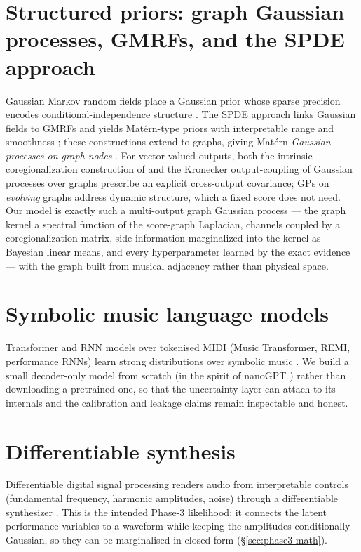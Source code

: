 \documentclass[11pt,a4paper]{report}
\begin{document}
\section{Structured priors: graph Gaussian processes, GMRFs, and the SPDE approach}
Gaussian Markov random fields place a Gaussian prior whose sparse precision encodes
conditional-independence structure \cite{rueheld2005}. The SPDE approach links
Gaussian fields to GMRFs and yields Mat\'ern-type priors with interpretable range
and smoothness \cite{lindgren2011}; these constructions extend to graphs, giving
Mat\'ern \emph{Gaussian processes on graph nodes} \cite{borovitskiy2021}. For
vector-valued outputs, both the intrinsic-coregionalization construction of
\cite{borovitskiy2021} and the Kronecker output-coupling of Gaussian processes over
graphs \cite{venkitaraman2018} prescribe an explicit cross-output covariance;
GPs on \emph{evolving} graphs \cite{blancomulero2021} address dynamic structure,
which a fixed score does not need. Our model is exactly such a multi-output graph
Gaussian process --- the graph kernel a spectral function of the score-graph
Laplacian, channels coupled by a coregionalization matrix, side information
marginalized into the kernel as Bayesian linear means, and every hyperparameter
learned by the exact evidence --- with the graph built from musical adjacency
rather than physical space.

\section{Symbolic music language models}
Transformer and RNN models over tokenised MIDI (Music Transformer, REMI,
performance RNNs) learn strong distributions over symbolic music
\cite{musictransformer,remi,oore2018}. We build a small decoder-only model from
scratch (in the spirit of nanoGPT \cite{nanogpt}) rather than downloading a
pretrained one, so that the uncertainty layer can attach to its internals and the
calibration and leakage claims remain inspectable and honest.

\section{Differentiable synthesis}
Differentiable digital signal processing renders audio from interpretable controls
(fundamental frequency, harmonic amplitudes, noise) through a differentiable
synthesizer \cite{ddsp}. This is the intended Phase-3 likelihood: it connects the
latent performance variables to a waveform while keeping the amplitudes
conditionally Gaussian, so they can be marginalised in closed form
(\S\ref{sec:phase3-math}).
\end{document}

